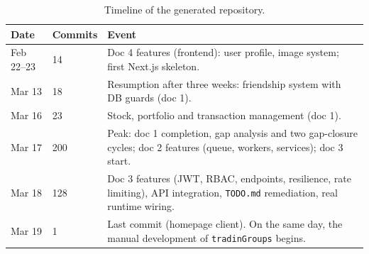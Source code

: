 \documentclass[11pt,a4paper]{article}
\newcommand{\file}[1]{\texttt{\small #1}}
\begin{document}
\begin{table}[H]
\centering
\small
\begin{tabular}{llp{8.5cm}}
\toprule
\textbf{Date} & \textbf{Commits} & \textbf{Event} \\
\midrule
Feb 22--23 & 14 & Doc 4 features (frontend): user profile, image system; first Next.js skeleton. \\
Mar 13 & 18 & Resumption after three weeks: friendship system with DB guards (doc 1). \\
Mar 16 & 23 & Stock, portfolio and transaction management (doc 1). \\
Mar 17 & 200 & Peak: doc 1 completion, gap analysis and two gap-closure cycles; doc 2 features (queue, workers, services); doc 3 start. \\
Mar 18 & 128 & Doc 3 features (JWT, RBAC, endpoints, resilience, rate limiting), API integration, \file{TODO.md} remediation, real runtime wiring. \\
Mar 19 & 1 & Last commit (homepage client). On the same day, the manual development of \file{tradinGroups} begins. \\
\bottomrule
\end{tabular}
\caption{Timeline of the generated repository.}
\end{table}
\end{document}
